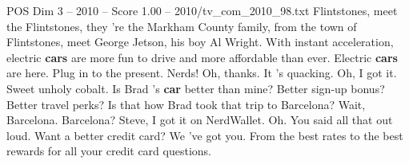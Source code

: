 \begin{textsample}{POS Dim 3 – 2010 – Score 1.00 – 2010/tv\_com\_2010\_98.txt}  \label{ex:f3_pos_047}
Flintstones, meet the Flintstones, they 're the Markham County family, from the town of Flintstones, meet George Jetson, his boy Al Wright.
With instant acceleration, electric \textbf{cars} are more fun to drive and more affordable than ever.
Electric \textbf{cars} are here.
Plug in to the present.
Nerds!
Oh, thanks.
It 's quacking.
Oh, I got it.
Sweet unholy cobalt.
Is Brad 's \textbf{car} better than mine?
Better sign-up bonus?
Better travel perks?
Is that how Brad took that trip to Barcelona?
Wait, Barcelona.
Barcelona?
Steve, I got it on NerdWallet.
Oh.
You said all that out loud.
Want a better credit card?
We 've got you.
From the best rates to the best rewards for all your credit card questions.

\end{textsample}
